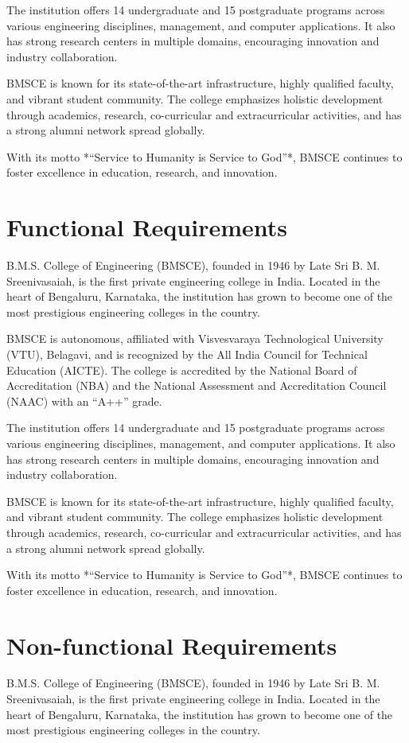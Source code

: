 \documentclass[12pt,a4paper]{report}
\begin{document}
The institution offers 14 undergraduate and 15 postgraduate programs across various 
engineering disciplines, management, and computer applications. It also has strong research 
centers in multiple domains, encouraging innovation and industry collaboration. 

BMSCE is known for its state-of-the-art infrastructure, highly qualified faculty, and vibrant 
student community. The college emphasizes holistic development through academics, research, 
co-curricular and extracurricular activities, and has a strong alumni network spread 
globally. 

With its motto *“Service to Humanity is Service to God”*, BMSCE continues to foster 
excellence in education, research, and innovation.
\section{Functional Requirements }
B.M.S. College of Engineering (BMSCE), founded in 1946 by Late Sri B. M. Sreenivasaiah, 
is the first private engineering college in India. Located in the heart of Bengaluru, 
Karnataka, the institution has grown to become one of the most prestigious engineering 
colleges in the country. 

BMSCE is autonomous, affiliated with Visvesvaraya Technological University (VTU), Belagavi, 
and is recognized by the All India Council for Technical Education (AICTE). The college is 
accredited by the National Board of Accreditation (NBA) and the National Assessment and 
Accreditation Council (NAAC) with an “A++” grade.

The institution offers 14 undergraduate and 15 postgraduate programs across various 
engineering disciplines, management, and computer applications. It also has strong research 
centers in multiple domains, encouraging innovation and industry collaboration. 

BMSCE is known for its state-of-the-art infrastructure, highly qualified faculty, and vibrant 
student community. The college emphasizes holistic development through academics, research, 
co-curricular and extracurricular activities, and has a strong alumni network spread 
globally. 

With its motto *“Service to Humanity is Service to God”*, BMSCE continues to foster 
excellence in education, research, and innovation.
\section{Non-functional Requirements }
B.M.S. College of Engineering (BMSCE), founded in 1946 by Late Sri B. M. Sreenivasaiah, 
is the first private engineering college in India. Located in the heart of Bengaluru, 
Karnataka, the institution has grown to become one of the most prestigious engineering 
colleges in the country. 
\end{document}
